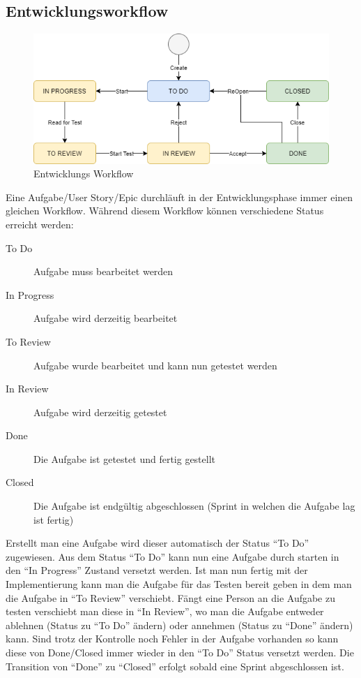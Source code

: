 \subsection{Entwicklungsworkflow}
\begin{figure}[!ht]
	\centering
	\includegraphics[width=\textwidth]{./ressourcen/entwicklungs-workflow.png}
	\caption{Entwicklungs Workflow}
\end{figure}
Eine Aufgabe/User Story/Epic durchläuft in der Entwicklungsphase immer einen gleichen Workflow. Während diesem Workflow können verschiedene Status erreicht werden:
\begin{description}
	\item[To Do] Aufgabe muss bearbeitet werden
	\item[In Progress] Aufgabe wird derzeitig bearbeitet
	\item[To Review] Aufgabe wurde bearbeitet und kann nun getestet werden
	\item[In Review] Aufgabe wird derzeitig getestet
	\item[Done] Die Aufgabe ist getestet und fertig gestellt
	\item[Closed] Die Aufgabe ist endgültig abgeschlossen (Sprint in welchen die Aufgabe lag ist fertig)
\end{description}
Erstellt man eine Aufgabe wird dieser automatisch der Status "`To Do"' zugewiesen. Aus dem Status "`To Do"' kann nun eine Aufgabe durch starten in den "`In Progress"' Zustand versetzt werden. Ist man nun fertig mit der Implementierung kann man die Aufgabe für das Testen bereit geben in dem man die Aufgabe in "`To Review"' verschiebt. Fängt eine Person an die Aufgabe zu testen verschiebt man diese in "`In Review"', wo man die Aufgabe entweder ablehnen (Status zu "`To Do"' ändern) oder annehmen (Status zu "`Done"' ändern) kann. Sind trotz der Kontrolle noch Fehler in der Aufgabe vorhanden so kann diese von Done/Closed immer wieder in den "`To Do"' Status versetzt werden. Die Transition von "`Done"' zu "`Closed"' erfolgt sobald eine Sprint abgeschlossen ist.
